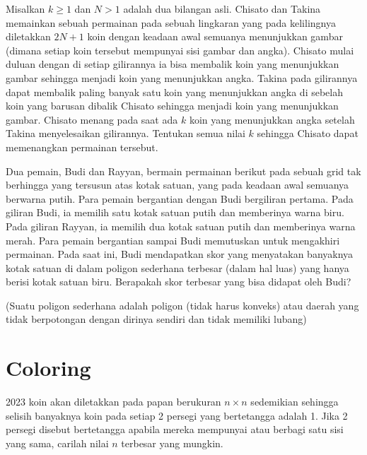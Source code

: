 \documentclass[12pt]{scrartcl}
\begin{document}
\begin{soaljawab}
    Misalkan $k \ge 1$ dan $N > 1$ adalah dua bilangan asli. Chisato dan Takina memainkan sebuah permainan pada sebuah lingkaran yang pada kelilingnya diletakkan $2N+1$ koin dengan keadaan awal semuanya menunjukkan gambar (dimana setiap koin tersebut mempunyai sisi gambar dan angka). Chisato mulai duluan dengan di setiap gilirannya ia bisa membalik koin yang menunjukkan gambar sehingga menjadi koin yang menunjukkan angka. Takina pada gilirannya dapat membalik paling banyak satu koin yang menunjukkan angka di sebelah koin yang barusan dibalik Chisato sehingga menjadi koin yang menunjukkan gambar. Chisato menang pada saat ada $k$ koin yang menunjukkan angka setelah Takina menyelesaikan gilirannya. Tentukan semua nilai $k$ sehingga Chisato dapat memenangkan permainan tersebut.
\end{soaljawab}

\begin{soaljawab}
Dua pemain, Budi dan Rayyan, bermain permainan berikut pada sebuah grid tak berhingga yang tersusun atas kotak satuan, yang pada keadaan awal semuanya berwarna putih. Para pemain bergantian dengan Budi bergiliran pertama. Pada giliran Budi, ia memilih satu kotak satuan putih dan memberinya warna biru. Pada giliran Rayyan, ia memilih dua kotak satuan putih dan memberinya warna merah. Para pemain bergantian sampai Budi memutuskan untuk mengakhiri permainan. Pada saat ini, Budi mendapatkan skor yang menyatakan banyaknya kotak satuan di dalam poligon sederhana terbesar (dalam hal luas) yang hanya berisi kotak satuan biru. Berapakah skor terbesar yang bisa didapat oleh Budi?

(Suatu poligon sederhana adalah poligon (tidak harus konveks) atau daerah yang tidak berpotongan dengan dirinya sendiri dan tidak memiliki lubang)
\end{soaljawab}

\section{Coloring}
\begin{soaljawab}
    2023 koin akan diletakkan pada papan berukuran $n \times n$ sedemikian sehingga selisih banyaknya koin pada setiap 2 persegi yang bertetangga adalah 1. Jika 2 persegi disebut bertetangga apabila mereka mempunyai atau berbagi satu sisi yang sama, carilah nilai $n$ terbesar yang mungkin.
\end{soaljawab}
\end{document}
